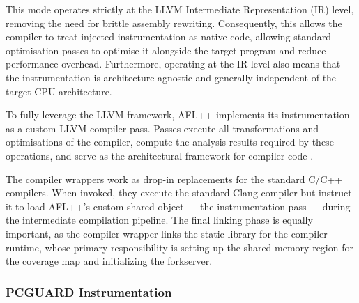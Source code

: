 This mode operates strictly at the LLVM Intermediate Representation (IR) level, removing the need for brittle assembly rewriting. Consequently, this allows the compiler to treat injected instrumentation as native code, allowing standard optimisation passes to optimise it alongside the target program and reduce performance overhead. Furthermore, operating at the IR level also means that the instrumentation is architecture-agnostic and generally independent of the target CPU architecture.

To fully leverage the LLVM framework, AFL++ implements its instrumentation as a custom LLVM compiler pass. Passes execute all transformations and optimisations of the compiler, compute the analysis results required by these operations, and serve as the architectural framework for compiler code \cite{writingllvmpass}.

The compiler wrappers work as drop-in replacements for the standard C/C++ compilers. When invoked, they execute the standard Clang compiler but instruct it to load AFL++'s custom shared object --- the instrumentation pass --- during the intermediate compilation pipeline. The final linking phase is equally important, as the compiler wrapper links the static library for the compiler runtime, whose primary responsibility is setting up the shared memory region for the coverage map and initializing the forkserver. 

\subsubsection{PCGUARD Instrumentation}

